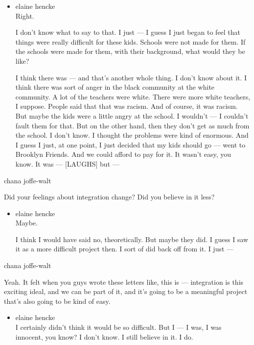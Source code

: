 \begin{itemize}
\item
  elaine hencke\\
  Right.

  I don't know what to say to that. I just --- I guess I just began to
  feel that things were really difficult for these kids. Schools were
  not made for them. If the schools were made for them, with their
  background, what would they be like?

  I think there was --- and that's another whole thing. I don't know
  about it. I think there was sort of anger in the black community at
  the white community. A lot of the teachers were white. There were more
  white teachers, I suppose. People said that that was racism. And of
  course, it was racism. But maybe the kids were a little angry at the
  school. I wouldn't --- I couldn't fault them for that. But on the
  other hand, then they don't get as much from the school. I don't know.
  I thought the problems were kind of enormous. And I guess I just, at
  one point, I just decided that my kids should go --- went to Brooklyn
  Friends. And we could afford to pay for it. It wasn't easy, you know.
  It was --- {[}LAUGHS{]} but ---
\end{itemize}

chana joffe-walt

Did your feelings about integration change? Did you believe in it less?

\begin{itemize}
\item
  elaine hencke\\
  Maybe.

  I think I would have said no, theoretically. But maybe they did. I
  guess I saw it as a more difficult project then. I sort of did back
  off from it. I just ---
\end{itemize}

chana joffe-walt

Yeah. It felt when you guys wrote these letters like, this is ---
integration is this exciting ideal, and we can be part of it, and it's
going to be a meaningful project that's also going to be kind of easy.

\begin{itemize}
\tightlist
\item
  elaine hencke\\
  I certainly didn't think it would be so difficult. But I --- I was, I
  was innocent, you know? I don't know. I still believe in it. I do.
\end{itemize}

